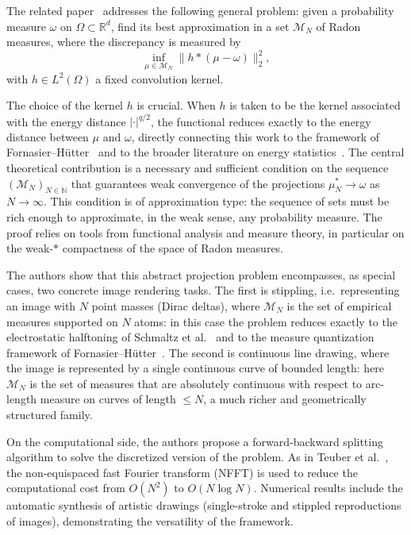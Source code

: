 \documentclass[12pt,a4paper,oneside]{amsart}
\theoremstyle{plain}
\theoremstyle{definition}
\numberwithin{equation}{section}
\numberwithin{figure}{section}
\numberwithin{table}{section}
\theoremstyle{remark}
\newcommand{\R}{\mathbb{R}}
\newcommand{\N}{\mathbb{N}}
\begin{document}
The related paper~\cite{chauffert2017projection} addresses the following general problem:
given a probability measure $\omega$ on $\Omega \subset \R^d$, find its best approximation
in a set $\mathcal{M}_N$ of Radon measures, where the discrepancy is measured by
\[
  \inf_{\mu \in \mathcal{M}_N}
  \bigl\| h * (\mu - \omega) \bigr\|_2^2,
\]
with $h \in L^2(\Omega)$ a fixed convolution kernel.
 
The choice of the kernel $h$ is crucial.
When $h$ is taken to be the kernel associated with the energy distance $|\cdot|^{q/2}$,
the functional reduces exactly to the energy distance between $\mu$ and $\omega$,
directly connecting this work to the framework of
Fornasier--H\"utter~\cite{fornasier2014consistency} and to the broader literature
on energy statistics~\cite{szekely2013energy,sejdinovic2013equivalence}.
The central theoretical contribution is a necessary and sufficient condition on the
sequence $(\mathcal{M}_N)_{N \in \N}$ that guarantees weak convergence of the
projections $\mu^*_N \to \omega$ as $N \to \infty$.
This condition is of approximation type: the sequence of sets must be rich enough
to approximate, in the weak sense, any probability measure.
The proof relies on tools from functional analysis and measure theory, in particular
on the weak-$*$ compactness of the space of Radon measures.
 
The authors show that this abstract projection problem encompasses, as special cases,
two concrete image rendering tasks.
The first is stippling, i.e.\ representing an image with $N$ point masses
(Dirac deltas), where $\mathcal{M}_N$ is the set of empirical measures supported on
$N$ atoms: in this case the problem reduces exactly to the electrostatic halftoning
of Schmaltz et al.~\cite{schmaltz2010electrostatic} and to the measure quantization
framework of Fornasier--H\"utter~\cite{fornasier2014consistency}.
The second is continuous line drawing, where the image is represented by a
single continuous curve of bounded length: here $\mathcal{M}_N$ is the set of measures
that are absolutely continuous with respect to arc-length measure on curves of length
$\leq N$, a much richer and geometrically structured family.
 
On the computational side, the authors propose a forward-backward splitting algorithm
to solve the discretized version of the problem.
As in Teuber et al.~\cite{teuber2011dithering}, the non-equispaced fast Fourier
transform (NFFT) is used to reduce the computational cost from $O(N^2)$ to
$O(N \log N)$. Numerical results include the automatic synthesis of artistic drawings
(single-stroke and stippled reproductions of images), demonstrating the versatility
of the framework.
 
\end{document}
